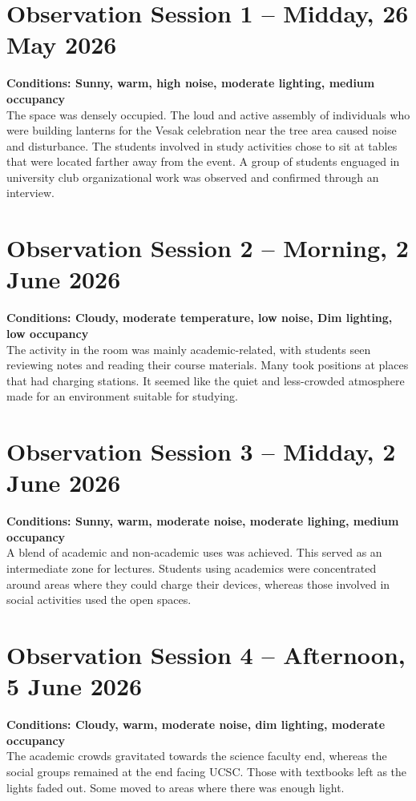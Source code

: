 \documentclass[12pt]{report}
\begin{document}
\section{Observation Session 1 -- Midday, 26 May 2026}
\textbf{Conditions: Sunny, warm, high noise, moderate lighting, medium occupancy}\\
The space was densely occupied. The loud and active assembly of individuals who were building lanterns for the Vesak celebration near the tree area caused noise and disturbance. The students involved in study activities chose to sit at tables that were located farther away from the event.
A group of students enguaged in university club organizational work was observed and confirmed through an interview.

\section{Observation Session 2 -- Morning, 2 June 2026}
\textbf{Conditions: Cloudy, moderate temperature, low noise, Dim lighting, low occupancy}\\
The activity in the room was mainly academic-related, with students seen reviewing notes and reading their course materials. Many took positions at places that had charging stations. It seemed like the quiet and less-crowded atmosphere made for an environment suitable for studying.

\section{Observation Session 3 -- Midday, 2 June 2026}
\textbf{Conditions: Sunny, warm, moderate noise, moderate lighing, medium occupancy}\\
A blend of academic and non-academic uses was achieved. This served as an intermediate zone for lectures. Students using academics were concentrated around areas where they could charge their devices, whereas those involved in social activities used the open spaces.

\section{Observation Session 4 -- Afternoon, 5 June 2026}
\textbf{Conditions: Cloudy, warm, moderate noise, dim lighting, moderate occupancy}\\
The academic crowds gravitated towards the science faculty end, whereas the social groups remained at the end facing UCSC. Those with textbooks left as the lights faded out. Some moved to areas where there was enough light.
\end{document}
